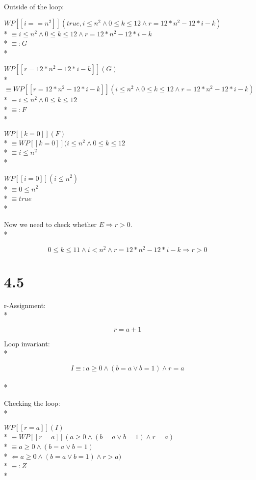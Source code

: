 \documentclass{article}
\begin{document}
Outside of the loop:

$ WP[\![i==n^2]\!](true, i \le n^2 \land 0 \le k \le 12 \land r=12*n^2-12*i-k) $ \\*
$ \equiv i\le n^2 \land 0\le k\le 12 \land r=12*n^2-12*i-k $ \\*
$ \equiv: G $ \\*

$ WP[\![r=12*n^2-12*i-k]\!](G) $ \\*
$ \equiv WP[\![r=12*n^2-12*i-k]\!](i\le n^2 \land 0\le k\le 12 \land r=12*n^2-12*i-k) $ \\*
$ \equiv i\le n^2 \land 0\le k\le 12 $ \\*
$ \equiv: F $ \\*

$ WP[\![k=0]\!](F) $ \\*
$ \equiv WP[\![k=0]\!](i\le n^2 \land 0\le k\le 12 $ \\*
$ \equiv i\le n^2 $ \\*

$ WP[\![i=0]\!](i\le n^2) $ \\*
$ \equiv 0\le n^2 $ \\*
$ \equiv true $ \\*

Now we need to check whether $ E \Rightarrow r>0 $. \\*

$$ 0\le k \le 11 \land i<n^2 \land r=12*n^2-12*i-k \Rightarrow r>0 $$

\section*{4.5}

r-Assignment: \\*

$$ r=a+1 $$

Loop invariant: \\*

$$ I\equiv: a\ge 0 \land (b=a \lor b=1) \land r=a $$ \\*

Checking the loop: \\*

$ WP[\![r=a]\!](I) $ \\*
$ \equiv WP[\![r=a]\!](a\ge 0 \land (b=a \lor b=1) \land r=a) $ \\*
$ \equiv a\ge 0 \land (b=a \lor b=1) $ \\*
$ \Leftarrow a\ge 0 \land (b=a \lor b=1) \land r>a) $ \\*
$ \equiv: Z $ \\*
\end{document}
